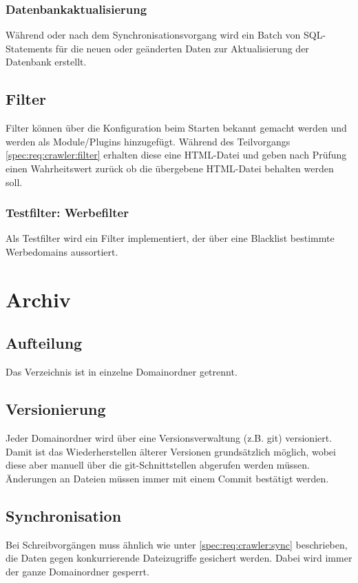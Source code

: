 	\subsubsection{Datenbankaktualisierung}
		Während oder nach dem Synchronisationsvorgang wird ein Batch von SQL-Statements für die neuen oder geänderten Daten
		zur Aktualisierung der Datenbank erstellt.
\subsection{Filter}
	Filter können über die Konfiguration beim Starten bekannt gemacht werden und werden als Module/Plugins hinzugefügt.
	Während des Teilvorgangs \ref{spec:req:crawler:filter} erhalten diese eine HTML-Datei und geben nach Prüfung einen Wahrheitswert zurück
	ob die übergebene HTML-Datei behalten werden soll.
	\subsubsection{Testfilter: Werbefilter}
		Als Testfilter wird ein Filter implementiert, der über eine Blacklist bestimmte Werbedomains aussortiert.


\section{Archiv} \label{spec:req:archive}
\subsection{Aufteilung}\label{spec:req:archive:dist}
	Das Verzeichnis ist in einzelne Domainordner getrennt. 
\subsection{Versionierung}\label{spec:req:archive:vers}
	Jeder Domainordner wird über eine Versionsverwaltung (z.B. git) versioniert. 
	Damit ist das Wiederherstellen älterer Versionen grundsätzlich möglich,
	wobei diese aber manuell über die git-Schnittstellen abgerufen werden müssen.
	Änderungen an Dateien müssen immer mit einem Commit bestätigt werden.
\subsection{Synchronisation}\label{spec:req:archive:sync}
	Bei Schreibvorgängen muss ähnlich wie unter \ref{spec:req:crawler:sync} beschrieben, 
	die Daten gegen konkurrierende Dateizugriffe gesichert werden.
	Dabei wird immer der ganze Domainordner gesperrt.
